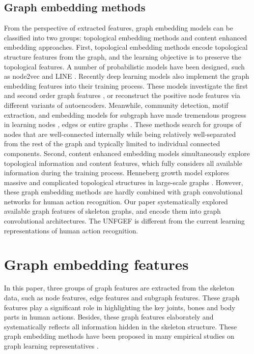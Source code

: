 \documentclass[journal]{IEEEtran}
\begin{document}
\subsection{Graph embedding methods}
From the perspective of extracted features, graph embedding models can be classified into two groups: topological embedding methods and content enhanced embedding approaches. First, topological embedding methods encode topological structure features from the graph, and the learning objective is to preserve the topological features. A number of probabilistic models have been designed, such as node2vec \cite{grover2016node2vec} and LINE \cite{tang2015line}. Recently deep learning models also implement the graph embedding features into their training process. These models investigate the first and second order graph features \cite{wang2016structural}, or reconstruct the positive node features \cite{cao2015grarep} via different variants of autoencoders. Meanwhile, community detection, motif extraction, and embedding models for subgraph have made tremendous progress in learning nodes \cite{adhikari2018sub2vec}, edges \cite{vashishth2019composition} or entire graphs \cite{monti2018motifnet}. These methods search for groups of nodes that are well-connected internally while being relatively well-separated from the rest of the graph and typically limited to individual connected components. Second, content enhanced embedding models simultaneously explore topological information and content features, which fully considers all available information during the training process. Henneberg growth model explores massive and complicated topological structures in large-scale graphs \cite{yang2018henneberg,lou2022controllability}. However, these graph embedding methods are hardly combined with graph convolutional networks for human action recognition. Our paper systematically explored available graph features of skeleton graphs, and encode them into graph convolutional architectures. The UNFGEF is different from the current learning representations of human action recognition.

\section{Graph embedding features}
In this paper, three groups of graph features are extracted from the skeleton data, such as node features, edge features and subgraph features. These graph features play a significant role in highlighting the key joints, bones and body parts in human actions. Besides, these graph features elaborately and systematically reflects all information hidden in the skeleton structure. These graph embedding methods have been proposed in many empirical studies on graph learning representatives \cite{fu2018link}.
\end{document}
